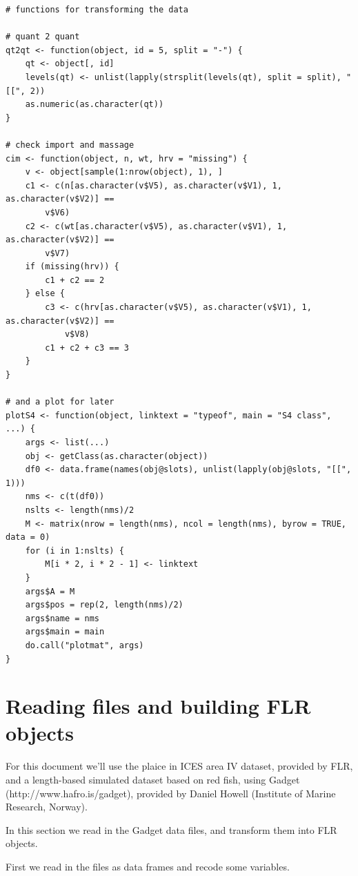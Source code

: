 \documentclass[a4paper,english,10pt]{article}\usepackage[]{graphicx}\usepackage[]{color}
\makeatletter
\newenvironment{kframe}{%
 \def\at@end@of@kframe{}%
 \ifinner\ifhmode%
  \def\at@end@of@kframe{\end{minipage}}%
  \begin{minipage}{\columnwidth}%
 \fi\fi%
 \def\FrameCommand##1{\hskip\@totalleftmargin \hskip-\fboxsep
 \colorbox{shadecolor}{##1}\hskip-\fboxsep
     \hskip-\linewidth \hskip-\@totalleftmargin \hskip\columnwidth}%
 \MakeFramed {\advance\hsize-\width
   \@totalleftmargin\z@ \linewidth\hsize
   \@setminipage}}%
 {\par\unskip\endMakeFramed%
 \at@end@of@kframe}
\newenvironment{knitrout}{}{} %
\makeatother
\begin{document}
\begin{knitrout}
\color{fgcolor}\begin{kframe}
\begin{verbatim}
# functions for transforming the data

# quant 2 quant
qt2qt <- function(object, id = 5, split = "-") {
    qt <- object[, id]
    levels(qt) <- unlist(lapply(strsplit(levels(qt), split = split), "[[", 2))
    as.numeric(as.character(qt))
}

# check import and massage
cim <- function(object, n, wt, hrv = "missing") {
    v <- object[sample(1:nrow(object), 1), ]
    c1 <- c(n[as.character(v$V5), as.character(v$V1), 1, as.character(v$V2)] == 
        v$V6)
    c2 <- c(wt[as.character(v$V5), as.character(v$V1), 1, as.character(v$V2)] == 
        v$V7)
    if (missing(hrv)) {
        c1 + c2 == 2
    } else {
        c3 <- c(hrv[as.character(v$V5), as.character(v$V1), 1, as.character(v$V2)] == 
            v$V8)
        c1 + c2 + c3 == 3
    }
}

# and a plot for later
plotS4 <- function(object, linktext = "typeof", main = "S4 class", ...) {
    args <- list(...)
    obj <- getClass(as.character(object))
    df0 <- data.frame(names(obj@slots), unlist(lapply(obj@slots, "[[", 1)))
    nms <- c(t(df0))
    nslts <- length(nms)/2
    M <- matrix(nrow = length(nms), ncol = length(nms), byrow = TRUE, data = 0)
    for (i in 1:nslts) {
        M[i * 2, i * 2 - 1] <- linktext
    }
    args$A = M
    args$pos = rep(2, length(nms)/2)
    args$name = nms
    args$main = main
    do.call("plotmat", args)
}
\end{verbatim}
\end{kframe}
\end{knitrout}


\section{Reading files and building FLR objects}

For this document we'll use the plaice in ICES area IV dataset, provided by FLR, and a length-based simulated dataset based on red fish, using Gadget (http://www.hafro.is/gadget), provided by Daniel Howell (Institute of Marine Research, Norway).

In this section we read in the Gadget data files, and transform them into FLR objects.

First we read in the files as data frames and recode some variables.
\end{document}

